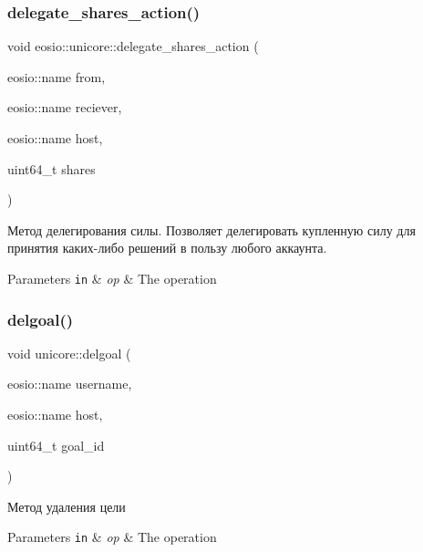 \subsubsection{\texorpdfstring{delegate\+\_\+shares\+\_\+action()}{delegate\_shares\_action()}}
{\footnotesize\ttfamily void eosio\+::unicore\+::delegate\+\_\+shares\+\_\+action (\begin{DoxyParamCaption}\item[{eosio\+::name}]{from,  }\item[{eosio\+::name}]{reciever,  }\item[{eosio\+::name}]{host,  }\item[{uint64\+\_\+t}]{shares }\end{DoxyParamCaption})\hspace{0.3cm}{\ttfamily [static]}}



Метод делегирования силы. Позволяет делегировать купленную силу для принятия каких-\/либо решений в пользу любого аккаунта. 


\begin{DoxyParams}[1]{Parameters}
\mbox{\tt in}  & {\em op} & The operation \\
\hline
\end{DoxyParams}
\mbox{\label{classeosio_1_1unicore_a9fd534e0b189439c6f18e99689911b3e}} 
\subsubsection{\texorpdfstring{delgoal()}{delgoal()}}
{\footnotesize\ttfamily void unicore\+::delgoal (\begin{DoxyParamCaption}\item[{eosio\+::name}]{username,  }\item[{eosio\+::name}]{host,  }\item[{uint64\+\_\+t}]{goal\+\_\+id }\end{DoxyParamCaption})}



Метод удаления цели 


\begin{DoxyParams}[1]{Parameters}
\mbox{\tt in}  & {\em op} & The operation \\
\hline
\end{DoxyParams}
\mbox{\label{classeosio_1_1unicore_a09d7d2d602069a26875aa1eee250d5f4}} 
